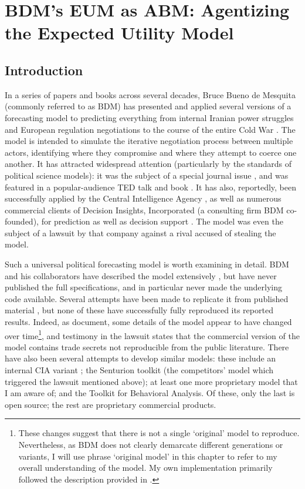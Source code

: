 \chapter[BDM's EUM as ABM]{BDM's EUM as ABM: Agentizing the Expected Utility Model}

\section{Introduction}

In a series of papers and books across several decades, Bruce Bueno de Mesquita (commonly referred to as BDM) has presented and applied several versions of a forecasting model to predicting everything from internal Iranian power struggles \citeyearpar{bdm_1984} and European regulation negotiations \citeyearpar{bdm_1994} to the course of the entire Cold War \citeyearpar{bdm_1998}. The model is intended to simulate the iterative negotiation process between multiple actors, identifying where they compromise and where they attempt to coerce one another. It has attracted widespread attention (particularly by the standards of political science models): it was the subject of a special journal issue \citep{kugler_1997}, and was featured in a popular-audience TED talk \citep{bdm_2009} and book \citep{bdm_2010}. It has also, reportedly, been successfully applied by the Central Intelligence Agency \citep{feder_1992}, as well as numerous commercial clients of Decision Insights, Incorporated (a consulting firm BDM co-founded), for prediction as well as decision support \citep{root_2013}. The model was even the subject of a lawsuit by that company against a rival \citep{dii_2011} accused of stealing the model. 

Such a universal political forecasting model is worth examining in detail. BDM and his collaborators have described the model extensively \citep{bdm_1984,bdm_1994,bdm_1997,bdm_2002,bdm_2011}, but have never published the full specifications, and in particular never made the underlying code available. Several attempts have been made to replicate it from published material \citep{scholz_2011,kimbrough_2014,mckibben_sanders_2014}, but none of these have successfully fully reproduced its reported results. Indeed, as \citet{scholz_2011} document, some details of the model appear to have changed over time\footnote{These changes suggest that there is not a single `original' model to reproduce. Nevertheless, as BDM does not clearly demarcate different generations or variants, I will use phrase `original model' in this chapter to refer to my overall understanding of the model. My own implementation primarily followed the description provided in \citet{bdm_2002}.}, and testimony in the \citet{dii_2011} lawsuit states that the commercial version of the model contains trade secrets not reproducible from the public literature. There have also been several attempts to develop similar models: these include an internal CIA variant \citep{feder_1992}; the Senturion toolkit \citep{abdollahian_2006} (the competitors' model which triggered the lawsuit mentioned above); at least one more proprietary model that I am aware of; and the \citet{wise_2015a} Toolkit for Behavioral Analysis. Of these, only the last is open source; the rest are proprietary commercial products.

